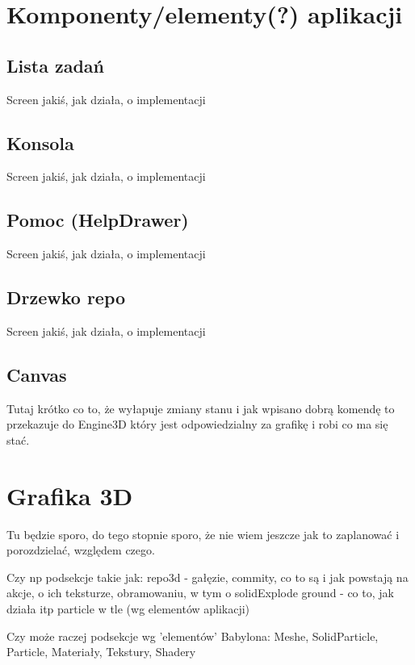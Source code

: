 \documentclass[11pt,a4paper,polish,thesis]{dcsbook}
\begin{document}
	\section{Komponenty/elementy(?) aplikacji}
	
	\subsection{Lista zadań}
	
	Screen jakiś, jak działa, o implementacji
	
	\subsection{Konsola}
	
	Screen jakiś, jak działa, o implementacji
	
	\subsection{Pomoc (HelpDrawer)}
	
	Screen jakiś, jak działa, o implementacji
	
	\subsection{Drzewko repo}
	
	Screen jakiś, jak działa, o implementacji
	
	\subsection{Canvas}
	
	Tutaj krótko co to, że wyłapuje zmiany stanu i jak wpisano dobrą komendę to przekazuje do Engine3D który jest odpowiedzialny za grafikę i robi co ma się stać.
	
	\section{Grafika 3D}
	Tu będzie sporo, do tego stopnie sporo, że nie wiem jeszcze jak to zaplanować i porozdzielać, względem czego.
	
	Czy np podsekcje takie jak:
	repo3d - gałęzie, commity, co to są i jak powstają na akcje, o ich teksturze, obramowaniu, w tym o solidExplode
	ground - co to, jak działa itp
	particle w tle
	(wg elementów aplikacji)
	
	Czy może raczej podsekcje wg 'elementów' Babylona:
	Meshe, SolidParticle, Particle, Materiały, Tekstury, Shadery
	
\end{document}
